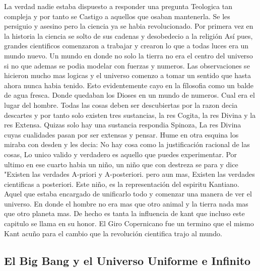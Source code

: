 \documentclass[12pt]{exam}
\begin{document}
\begin{multicols}{2}
La verdad nadie estaba dispuesto a responder una pregunta Teologica tan compleja y por tanto se Castigo a aquellos que osaban mantenerla. Se les persiguio y asesino
pero la ciencia ya se habia revolucionado. Por primera vez en la historia la ciencia se solto de sus cadenas y desobedecio a la religión
Así pues, grandes cientificos comenzaron a trabajar y crearon lo que a todas luces era un mundo nuevo. Un mundo en donde no solo
la tierra no era el centro del universo si no que ademas se podia modelar con fuerzas y numeros. Las observaciones se 
hicieron mucho mas logicas y el universo comenzo a tomar un sentido que hasta ahora nunca habia tenido. Esto evidentemente
cayo en la fílosofia como un balde de agua fresca. Donde quedaban los Dioses en un mundo de numeros. Cual era el lugar del hombre.
Todas las cosas deben ser descubiertas por la razon decia descartes y por tanto solo existen tres sustancias, la res Cogita, la res Divina 
y la res Extensa. Quizas solo hay una sustancia respondia Spinoza, La res Divina cuyas cualidades pasan por ser extensas y pensar.
Hume en otra esquina los miraba con desden y les decia: No hay cosa como la justificación racional de las cosas, Lo unico valido
y verdadero es aquello que puedes experimentar. Por ultimo en ese cuarto habia un niño, un niño que con destreza se para y dice
"Existen las verdades A-priori y A-posteriori. pero aun mas, Existen las verdades cientificas a posteriori. Este niño, es la 
representación del espiritu Kantiano. Aquel que estaba encargado de unificarlo todo y comenzar una manera de ver el universo.
En donde el hombre no era mas que otro animal y la tierra nada mas que otro planeta mas. De hecho es tanta la influencia de 
kant que incluso este capitulo se llama en su honor. El Giro Copernicano fue un termino que el mismo Kant acuño para el cambio
que la revolución cientifica trajo al mundo.

\subsection*{El Big Bang y el Universo Uniforme e Infinito}


\end{multicols}
\end{document}
